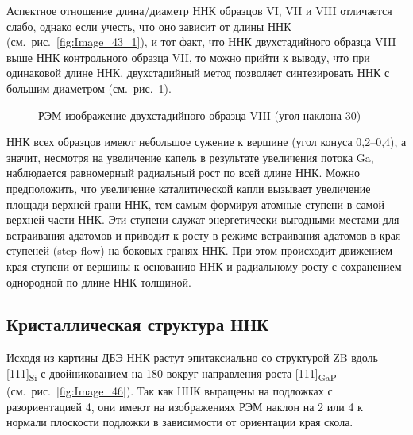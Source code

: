 Аспектное отношение длина/диаметр ННК образцов VI, VII и VIII отличается слабо,
однако если учесть, что оно зависит от длины ННК
(см.~рис.~\cref{fig:Image_43_1}), и тот факт, что ННК двухстадийного образца
VIII выше ННК контрольного образца VII, то можно прийти к выводу, что при
одинаковой длине ННК, двухстадийный метод позволяет синтезировать ННК с большим
диаметром (см.~рис.~\cref{fig:Image_45}).

\begin{figure}[ht]  \caption{РЭМ изображение
	двухстадийного образца VIII (угол наклона 30{\textdegree})}\label{fig:Image_45}
\end{figure}

ННК всех образцов имеют небольшое сужение к вершине (угол конуса
0,2--0,4{\textdegree}), а значит, несмотря на увеличение капель в результате
увеличения потока Ga, наблюдается равномерный радиальный рост по всей длине
ННК. Можно предположить, что увеличение каталитической капли вызывает
увеличение площади верхней грани ННК, тем самым формируя атомные ступени в
самой верхней части ННК. Эти ступени служат энергетически выгодными местами для
встраивания адатомов и приводит к росту в режиме встраивания адатомов в края
ступеней (step-flow) на боковых гранях ННК. При этом происходит движением края
ступени от вершины к основанию ННК и радиальному росту с сохранением однородной
по длине ННК толщиной.

\subsection{Кристаллическая структура ННК}\label{subsec:ch6/sec2/sub6}

Исходя из картины ДБЭ ННК растут эпитаксиально со структурой ZB вдоль
[111]\textsubscript{Si} с двойникованием на 180{\textdegree} вокруг направления
роста [111]\textsubscript{GaP} (см.~рис.~\cref{fig:Image_46}). Так как ННК
выращены на подложках с разориентацией 4{\textdegree}, они имеют на
изображениях РЭМ наклон на 2{\textdegree} или 4{\textdegree} к нормали
плоскости подложки в зависимости от ориентации края скола.

